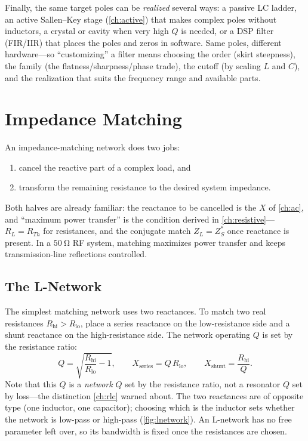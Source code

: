 Finally, the same target poles can be \emph{realized} several ways: a passive LC
ladder, an active Sallen--Key stage (\cref{ch:active}) that makes complex poles
without inductors, a crystal or cavity when very high \(Q\) is needed, or a DSP
filter (FIR/IIR) that places the poles and zeros in software. Same poles,
different hardware---so ``customizing'' a filter means choosing the order (skirt
steepness), the family (the flatness/sharpness/phase trade), the cutoff (by
scaling \(L\) and \(C\)), and the realization that suits the frequency range and
available parts.

\section{Impedance Matching}
An impedance-matching network does two jobs:
\begin{enumerate}
\item cancel the reactive part of a complex load, and
\item transform the remaining resistance to the desired system impedance.
\end{enumerate}
Both halves are already familiar: the reactance to be cancelled is the \(X\) of
\cref{ch:ac}, and ``maximum power transfer'' is the condition derived in
\cref{ch:resistive}---\(R_L=R_{Th}\) for resistances, and the conjugate match
\(Z_L=Z_S^{*}\) once reactance is present. In a \(\SI{50}{\ohm}\) RF system, matching
maximizes power transfer and keeps transmission-line reflections controlled.

\subsection{The L-Network}
The simplest matching network uses two reactances. To match two real resistances
\(R_{\text{hi}}>R_{\text{lo}}\), place a series reactance on the low-resistance
side and a shunt reactance on the high-resistance side. The network operating
\(Q\) is set by the resistance ratio:
\[
Q=\sqrt{\frac{R_{\text{hi}}}{R_{\text{lo}}}-1},
\qquad
X_{\text{series}}=Q\,R_{\text{lo}},
\qquad
X_{\text{shunt}}=\frac{R_{\text{hi}}}{Q}.
\]
Note that this \(Q\) is a \emph{network} \(Q\) set by the resistance ratio, not a
resonator \(Q\) set by loss---the distinction \cref{ch:rlc} warned about. The two
reactances are of opposite type (one inductor, one capacitor); choosing
which is the inductor sets whether the network is low-pass or high-pass
(\cref{fig:lnetwork}). An L-network has no free parameter left over, so its
bandwidth is fixed once the resistances are chosen.

